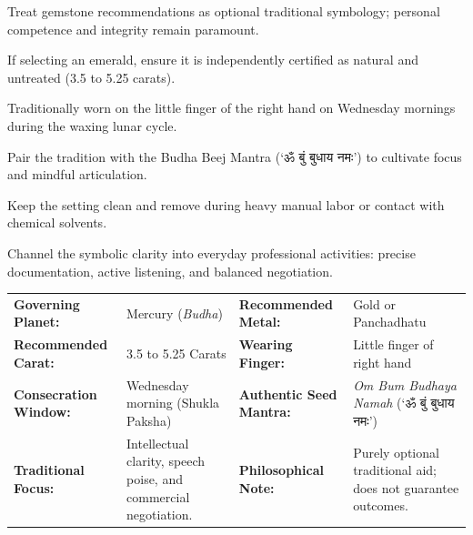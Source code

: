 \begin{diamondlist}
  \item {\fontsize{8.5}{12}\selectfont Treat gemstone recommendations as optional traditional symbology; personal competence and integrity remain paramount.}
  \item {\fontsize{8.5}{12}\selectfont If selecting an emerald, ensure it is independently certified as natural and untreated (3.5 to 5.25 carats).}
  \item {\fontsize{8.5}{12}\selectfont Traditionally worn on the little finger of the right hand on Wednesday mornings during the waxing lunar cycle.}
  \item {\fontsize{8.5}{12}\selectfont Pair the tradition with the Budha Beej Mantra (‘ॐ बुं बुधाय नमः’) to cultivate focus and mindful articulation.}
  \item {\fontsize{8.5}{12}\selectfont Keep the setting clean and remove during heavy manual labor or contact with chemical solvents.}
  \item {\fontsize{8.5}{12}\selectfont Channel the symbolic clarity into everyday professional activities: precise documentation, active listening, and balanced negotiation.}
\end{diamondlist}


\begin{executivecard}
  \sffamily\fontsize{8}{11.5}\selectfont
  \begin{tabularx}{\linewidth}{@{}l X l X@{}}
    \textbf{Governing Planet:} & Mercury (\textit{Budha}) & \textbf{Recommended Metal:} & Gold or Panchadhatu \\
    \textbf{Recommended Carat:} & 3.5 to 5.25 Carats & \textbf{Wearing Finger:} & Little finger of right hand \\
    \textbf{Consecration Window:} & Wednesday morning (Shukla Paksha) & \textbf{Authentic Seed Mantra:} & \textit{Om Bum Budhaya Namah} (‘ॐ बुं बुधाय नमः’) \\
    \textbf{Traditional Focus:} & Intellectual clarity, speech poise, and commercial negotiation. & \textbf{Philosophical Note:} & Purely optional traditional aid; does not guarantee outcomes. \\
  \end{tabularx}
\end{executivecard}\vspace{2mm}

